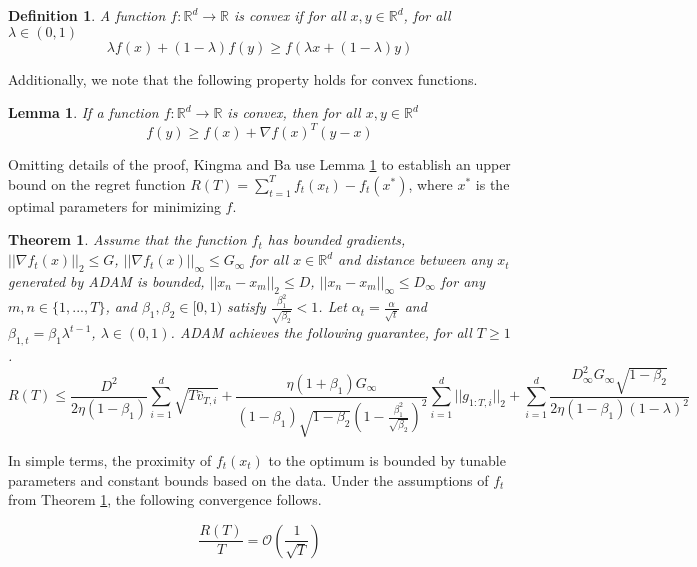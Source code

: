 \documentclass[letterpaper,11 pt]{article}
\newtheorem{theorem}{Theorem}
\newtheorem{corollary}{Corollary}
\newtheorem{lemma}{Lemma}
\newtheorem{definition}{Definition}
\begin{document}
\begin{definition}\label{def:convex}
A function $f:\mathbb{R}^{d}\rightarrow \mathbb{R}$ is convex if for all $x,y\in \mathbb{R}^{d}$, for all $\lambda \in (0,1)$
\[
\lambda f(x) + (1-\lambda)f(y) \geq f(\lambda x + (1-\lambda)y)
\]
\end{definition}
Additionally, we note that the following property holds for convex functions.
\begin{lemma}\label{lemma:convex}
If a function $f:\mathbb{R}^{d}\rightarrow \mathbb{R}$ is convex, then for all $x,y\in \mathbb{R}^{d}$
\[
f(y) \geq f(x) + \nabla f(x)^{T} (y-x)
\]
\end{lemma}

Omitting details of the proof, Kingma and Ba use Lemma \ref{lemma:convex} to establish an upper bound on the regret function $R(T) = \sum_{t=1}^{T}{f_{t}(x_{t}) - f_{t}(x^{*}) }$, where $x^{*}$ is the optimal parameters for minimizing $f$. 

\begin{theorem}\label{thm:adamregbound}
Assume that the function $f_t$ has bounded gradients, $|| \nabla f_{t}(x)||_{2} \leq G$, $|| \nabla f_{t}(x)||_{\infty} \leq G_{\infty}$ for all $x \in \mathbb{R}^{d}$ and distance between any $x_t$ generated by ADAM is bounded, $||x_{n} - x_{m}||_{2} \leq D$, $||x_{n} - x_{m}||_{\infty} \leq D_{\infty}$ for any $m,n \in \{1,...,T\}$, and $\beta_{1}, \beta_{2} \in [0,1)$ satisfy $\frac{\beta_{1}^{2}}{\sqrt{\beta_{2}}} < 1$. Let $\alpha_{t} = \frac{\alpha}{\sqrt{t}}$ and $\beta_{1,t} = \beta_{1}\lambda^{t-1}$, $\lambda \in (0,1)$. ADAM achieves the following guarantee, for all $T \geq 1$.
\[
R(T)\leq\frac{D^{2}}{2\eta(1-\beta_{1})}\sum_{i=1}^{d}\sqrt{T\hat{v}_{T,i}}+\frac{\eta(1+\beta_{1})G_{\infty}}{(1-\beta_{1})\sqrt{1-\beta_{2}}(1-\frac{\beta_{1}^{2}}{\sqrt{\beta_{2}}})^{2}}\sum_{i=1}^{d}||g_{1:T,i}||_{2}+\sum_{i=1}^{d}\frac{D_{\infty}^{2}G_{\infty}\sqrt{1-\beta_{2}}}{2\eta(1-\beta_{1})(1-\lambda)^{2}}
\]
\end{theorem}

In simple terms, the proximity of $f_{t}(x_{t})$ to the optimum is bounded by tunable parameters and constant bounds based on the data. Under the assumptions of $f_{t}$ from Theorem \ref{thm:adamregbound}, the following convergence follows.

\[
\frac{R(T)}{T} = \mathcal{O}\left(\frac{1}{\sqrt{T}}\right)
\]
\end{document}
